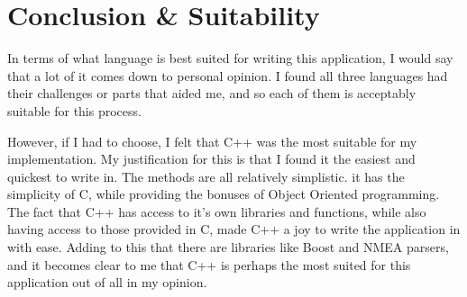 \documentclass{article}
\begin{document}



\section{Conclusion \& Suitability}
In terms of what language is best suited for writing this application, I would say that a lot of it comes down to personal opinion. I found all three languages had their challenges or parts that aided me, and so each of them is acceptably suitable for this process. 

However, if I had to choose, I felt that C++  was the most suitable for my implementation. My justification for this is that I found it the easiest and quickest to write in. The methods are all relatively simplistic. it has the simplicity of C, while providing the bonuses of Object Oriented programming. The fact that C++ has access to it's own libraries and functions, while also having access to those provided in C, made C++ a joy to write the application in with ease. Adding to this that there are libraries like Boost and NMEA parsers, and it becomes clear to me that C++ is perhaps the most suited for this application out of all in my opinion.

\clearpage


\begin{thebibliography}{1}



\end{thebibliography}
\end{document}
